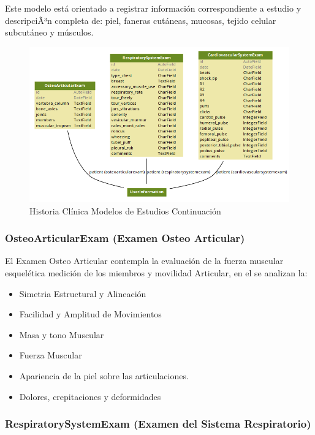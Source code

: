 Este modelo está orientado a registrar información correspondiente a estudio y descripciÃ³n completa de: piel, faneras cutáneas, mucosas, tejido celular subcutáneo y músculos.

\begin{figure}[H]
    \centering
    \includegraphics[scale=0.5]{resourse/hc4.png}
    \caption{Historia Clínica Modelos de Estudios Continuación}
    \label{fig:hc3}
\end{figure} 


\subsubsection{OsteoArticularExam (Examen Osteo Articular)}

El Examen Osteo Articular contempla la evaluación de la fuerza muscular esquelética medición de los miembros y movilidad Articular, en el se analizan la:

\begin{itemize}
    \item Simetria Estructural y Alineación
    \item Facilidad y Amplitud de Movimientos
    \item Masa y tono Muscular
    \item Fuerza Muscular
    \item Apariencia de la piel sobre las articulaciones.
    \item Dolores, crepitaciones y deformidades
\end{itemize}

\subsubsection{RespiratorySystemExam (Examen del Sistema Respiratorio)}

